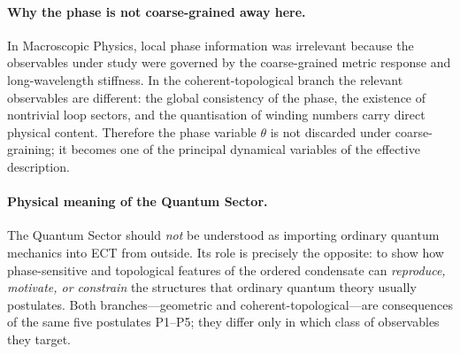 \paragraph{Why the phase is not coarse-grained away here.}
In Macroscopic Physics, local phase information was irrelevant
because the observables under study were governed by the coarse-grained
metric response and long-wavelength stiffness.
In the coherent-topological branch the relevant observables are
different: the global consistency of the phase, the existence of
nontrivial loop sectors, and the quantisation of winding numbers
carry direct physical content.
Therefore the phase variable $\theta$ is not discarded under
coarse-graining; it becomes one of the principal dynamical variables
of the effective description.

\paragraph{Physical meaning of the Quantum Sector.}
The Quantum Sector should \emph{not} be understood as importing
ordinary quantum mechanics into ECT from outside.
Its role is precisely the opposite: to show how phase-sensitive and
topological features of the ordered condensate can \emph{reproduce,
motivate, or constrain} the structures that ordinary quantum theory
usually postulates.
Both branches---geometric and coherent-topological---are consequences
of the same five postulates P1--P5; they differ only in which class
of observables they target.

